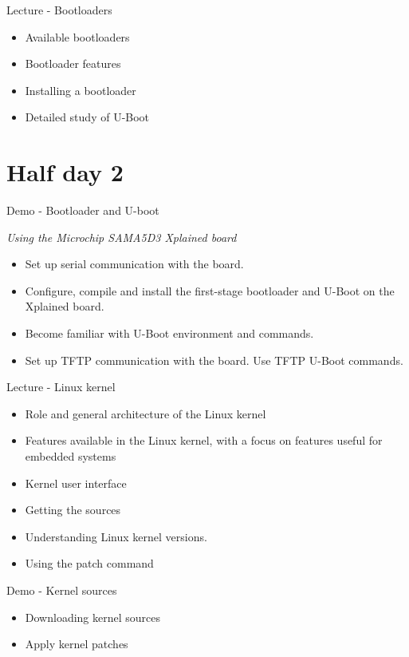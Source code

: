 \documentclass[a4paper,12pt,obeyspaces,spaces,hyphens]{article}
\begin{document}
\feagendaonecolumn
{Lecture - Bootloaders}
{
  \begin{itemize}
  \item Available bootloaders
  \item Bootloader features
  \item Installing a bootloader
  \item Detailed study of U-Boot
  \end{itemize}
}

\section{Half day 2}

\feagendaonecolumn
{Demo - Bootloader and U-boot}
{
  {\em Using the Microchip SAMA5D3 Xplained board}
  \begin{itemize}
  \item Set up serial communication with the board.
  \item Configure, compile and install the first-stage bootloader
        and U-Boot on the Xplained board.
  \item Become familiar with U-Boot environment and commands.
  \item Set up TFTP communication with the board. Use TFTP U-Boot commands.
  \end{itemize}
}

\feagendatwocolumn
{Lecture - Linux kernel}
{
  \begin{itemize}
  \item Role and general architecture of the Linux kernel
  \item Features available in the Linux kernel,
        with a focus on features useful for embedded systems
  \item Kernel user interface
  \item Getting the sources
  \item Understanding Linux kernel versions.
  \item Using the patch command
  \end{itemize}
}
{Demo - Kernel sources}
{
  \begin{itemize}
  \item Downloading kernel sources
  \item Apply kernel patches
  \end{itemize}
}
\end{document}
